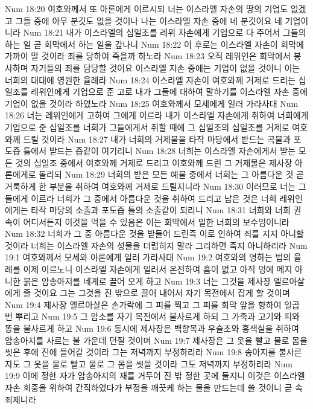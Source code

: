 Num 18:20  여호와께서 또 아론에게 이르시되 너는 이스라엘 자손의 땅의 기업도 없겠고 그들 중에 아무 분깃도 없을 것이나 나는 이스라엘 자손 중에 네 분깃이요 네 기업이니라
Num 18:21  내가 이스라엘의 십일조를 레위 자손에게 기업으로 다 주어서 그들의 하는 일 곧 회막에서 하는 일을 갚나니
Num 18:22  이 후로는 이스라엘 자손이 회막에 가까이 말 것이라 죄를 당하여 죽을까 하노라
Num 18:23  오직 레위인은 회막에서 봉사하며 자기들의 죄를 담당할 것이요 이스라엘 자손 중에는 기업이 없을 것이니 이는 너희의 대대에 영원한 율례라
Num 18:24  이스라엘 자손이 여호와께 거제로 드리는 십일조를 레위인에게 기업으로 준 고로 내가 그들에 대하여 말하기를 이스라엘 자손 중에 기업이 없을 것이라 하였노라
Num 18:25  여호와께서 모세에게 일러 가라사대
Num 18:26  너는 레위인에게 고하여 그에게 이르라 내가 이스라엘 자손에게 취하여 너희에게 기업으로 준 십일조를 너희가 그들에게서 취할 때에 그 십일조의 십일조를 거제로 여호와께 드릴 것이라
Num 18:27  내가 너희의 거제물을 타작 마당에서 받드는 곡물과 포도즙 틀에서 받드는 즙같이 여기리니
Num 18:28  너희는 이스라엘 자손에게서 받는 모든 것의 십일조 중에서 여호와께 거제로 드리고 여호와께 드린 그 거제물은 제사장 아론에게로 돌리되
Num 18:29  너희의 받은 모든 예물 중에서 너희는 그 아름다운 것 곧 거룩하게 한 부분을 취하여 여호와께 거제로 드릴지니라
Num 18:30  이러므로 너는 그들에게 이르라 너희가 그 중에서 아름다운 것을 취하여 드리고 남은 것은 너희 레위인에게는 타작 마당의 소출과 포도즙 틀의 소출같이 되리니
Num 18:31  너희와 너희 권속이 어디서든지 이것을 먹을 수 있음은 이는 회막에서 일한 너희의 보수임이니라
Num 18:32  너희가 그 중 아름다운 것을 받들어 드린즉 이로 인하여 죄를 지지 아니할 것이라 너희는 이스라엘 자손의 성물을 더럽히지 말라 그리하면 죽지 아니하리라
Num 19:1  여호와께서 모세와 아론에게 일러 가라사대
Num 19:2  여호와의 명하는 법의 율례를 이제 이르노니 이스라엘 자손에게 일러서 온전하여 흠이 없고 아직 멍에 메지 아니한 붉은 암송아지를 네게로 끌어 오게 하고
Num 19:3  너는 그것을 제사장 엘르아살에게 줄 것이요 그는 그것을 진 밖으로 끌어 내어서 자기 목전에서 잡게 할 것이며
Num 19:4  제사장 엘르아살은 손가락에 그 피를 찍고 그 피를 회막 앞을 향하여 일곱 번 뿌리고
Num 19:5  그 암소를 자기 목전에서 불사르게 하되 그 가죽과 고기와 피와 똥을 불사르게 하고
Num 19:6  동시에 제사장은 백향목과 우슬초와 홍색실을 취하여 암송아지를 사르는 불 가운데 던질 것이며
Num 19:7  제사장은 그 옷을 빨고 물로 몸을 씻은 후에 진에 들어갈 것이라 그는 저녁까지 부정하리라
Num 19:8  송아지를 불사른 자도 그 옷을 물로 빨고 물로 그 몸을 씻을 것이라 그도 저녁까지 부정하리라
Num 19:9  이에 정한 자가 암송아지의 재를 거두어 진 밖 정한 곳에 둘지니 이것은 이스라엘 자손 회중을 위하여 간직하였다가 부정을 깨끗케 하는 물을 만드는데 쓸 것이니 곧 속죄제니라
